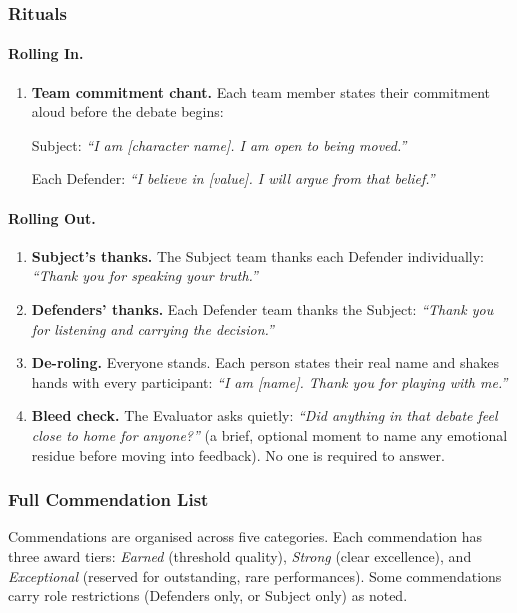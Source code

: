 \documentclass[12pt]{article}
\begin{document}
\subsubsection{Rituals}

\paragraph{Rolling In.}
\begin{enumerate}
    \item \textbf{Team commitment chant.} Each team member states their commitment aloud before the debate begins:

    Subject: \textit{``I am [character name]. I am open to being moved.''}

    Each Defender: \textit{``I believe in [value]. I will argue from that belief.''}
\end{enumerate}

\paragraph{Rolling Out.}
\begin{enumerate}
    \item \textbf{Subject's thanks.} The Subject team thanks each Defender individually: \textit{``Thank you for speaking your truth.''}
    \item \textbf{Defenders' thanks.} Each Defender team thanks the Subject: \textit{``Thank you for listening and carrying the decision.''}
    \item \textbf{De-roling.} Everyone stands. Each person states their real name and shakes hands with every participant: \textit{``I am [name]. Thank you for playing with me.''}
    \item \textbf{Bleed check.} The Evaluator asks quietly: \textit{``Did anything in that debate feel close to home for anyone?''} (a brief, optional moment to name any emotional residue before moving into feedback). No one is required to answer.
\end{enumerate}

\subsubsection{Full Commendation List}

Commendations are organised across five categories. Each commendation has three award tiers: \textit{Earned} (threshold quality), \textit{Strong} (clear excellence), and \textit{Exceptional} (reserved for outstanding, rare performances). Some commendations carry role restrictions (Defenders only, or Subject only) as noted.
\end{document}
